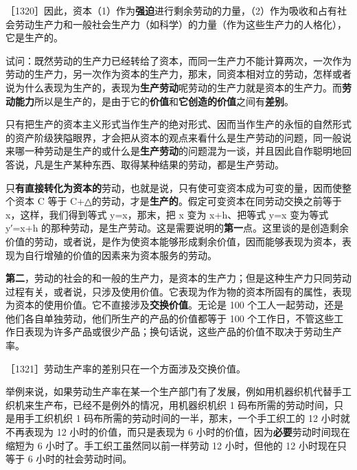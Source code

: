 
［1320］因此，资本（1）作为\textbf{强迫}进行剩余劳动的力量，（2）作为吸收和占有社会劳动生产力和一般社会生产力（如科学）的力量（作为这些生产力的人格化），它是生产的。

试问：既然劳动的生产力已经转给了资本，而同一生产力不能计算两次，一次作为劳动的生产力，另一次作为资本的生产力，那末，同资本相对立的劳动，怎样或者说为什么表现为生产的，表现为\textbf{生产劳动}呢\fontbox{~\{}劳动的生产力就是资本的生产力。而\textbf{劳动能力}所以是生产的，是由于它的\textbf{价值}和\textbf{它创造的价值}之间有\textbf{差别}。\fontbox{\}~}


只有把生产的资本主义形式当作生产的绝对形式、因而当作生产的永恒的自然形式的资产阶级狭隘眼界，才会把从资本的观点来看什么是生产劳动的问题，同一般说来哪一种劳动是生产的或什么是\textbf{生产劳动}的问题混为一谈，并且因此自作聪明地回答说，凡是生产某种东西、取得某种结果的劳动，都是生产劳动。

只\textbf{有直接转化为资本的}劳动，也就是说，只有使可变资本成为可变的量，因而使整个资本 C 等于 C+△的劳动，才是\textbf{生产的}。假定可变资本在同劳动交换之前等于 x，这样，我们得到等式 y=x，那末，把 x 变为 x+h、把等式 y=x 变为等式 y′=x+h 的那种劳动，是生产劳动。这是需要说明的\textbf{第一}点。这里谈的是创造剩余价值的劳动，或者说，是作为使资本能够形成剩余价值，因而能够表现为资本，表现为自行增殖的价值的因素来为资本服务的劳动。

\textbf{第二}，劳动的社会的和一般的生产力，是资本的生产力；但是这种生产力只同劳动过程有关，或者说，只涉及使用价值。它表现为作为物的资本所固有的属性，表现为资本的使用价值。它不直接涉及\textbf{交换价值}。无论是 100 个工人一起劳动，还是他们各自单独劳动，他们所生产的产品的价值都等于 100 个工作日，不管这些工作日表现为许多产品或很少产品；换句话说，这些产品的价值不取决于劳动生产率。

［1321］劳动生产率的差别只在一个方面涉及交换价值。

举例来说，如果劳动生产率在某一个生产部门有了发展，例如用机器织机代替手工织机来生产布，已经不是例外的情况，用机器织机织 1 码布所需的劳动时间，只是用手工织机织 1 码布所需的劳动时间的一半，那末，一个手工织工的 12 小时就不再表现为 12 小时的价值，而只是表现为 6 小时的价值，因为\textbf{必要}劳动时间现在缩短为 6 小时了。手工织工虽然同以前一样劳动 12 小时，但他的 12 小时现在只等于 6 小时的社会劳动时间。


